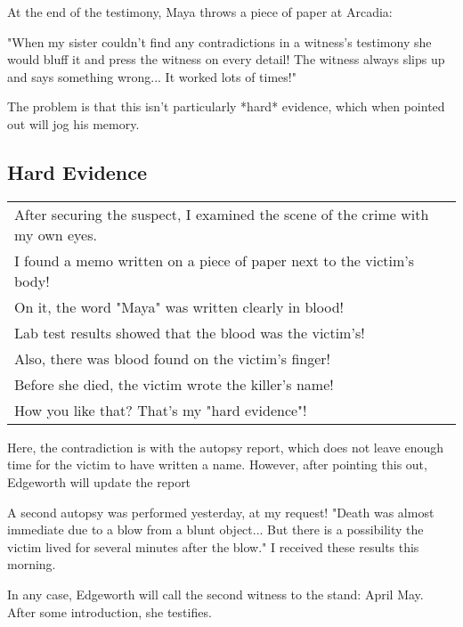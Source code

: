 At the end of the testimony, Maya throws a piece of paper at Arcadia:
\begin{center}
"When my sister couldn't find any contradictions in a witness's testimony she would bluff it and press the witness on every detail! The witness always slips up and says something wrong... It worked lots of times!"
\end{center}
The problem is that this isn't particularly *hard* evidence, which when pointed out will jog his memory.

\subsection{Hard Evidence}
\begin{tabular}{p{11cm}}
After securing the suspect, I examined the scene of the crime with my own eyes.\\
I found a memo written on a piece of paper next to the victim's body!\\
On it, the word "Maya" was written clearly in blood!\\
Lab test results showed that the blood was the victim's!\\
Also, there was blood found on the victim's finger!\\
Before she died, the victim wrote the killer's name!\\
How you like that? That's my "hard evidence"! \\
\end{tabular}

Here, the contradiction is with the autopsy report, which does not leave enough time for the victim to have written a name. However, after pointing this out, Edgeworth will update the report
\begin{center}
A second autopsy was performed yesterday, at my request! "Death was almost immediate due to a blow from a blunt object... But there is a possibility the victim lived for several minutes after the blow." I received these results this morning. 
\end{center}

In any case, Edgeworth will call the second witness to the stand: April May. After some introduction, she testifies.


